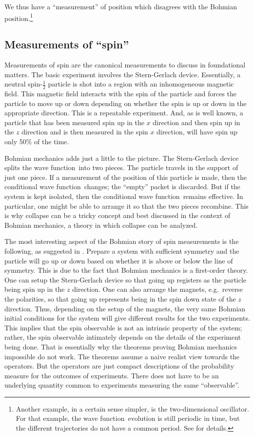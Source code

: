 \documentclass[11pt]{article}
\theoremstyle{remark}
\begin{document}
We thus have a ``measurement'' of
position which disagrees with the Bohmian position.\footnote{Another 
example, in a certain sense simpler, is the two-dimensional
oscillator. For that example, the wave function\ evolution is still periodic in
time, but the different trajectories do not have a common period. See
\cite{DGZ03} for details.}


\subsection{Measurements of ``spin''}

Measurements of spin are the canonical measurements to discuss in
foundational matters. The basic experiment involves the Stern-Gerlach
device. Essentially, a  neutral spin-$\frac{1}{2}$ particle is shot into a
region with an inhomogeneous magnetic field. This magnetic field
interacts with the spin of the particle and forces the particle to
move up or down depending on whether the spin is up or down in the
appropriate direction. This is a repeatable
experiment. And, as is well known, a particle that has been measured spin up in
the $x$ direction and then spin up in the $z$ direction and is then
measured in the spin $x$ direction, will have spin up only 50\% of
the time. 

Bohmian mechanics adds just a little to the picture. The Stern-Gerlach
device splits the wave function\ into two pieces.  The particle travels in the
support of just one piece. If a measurement of the position of this
particle is made, then the conditional wave function\ changes; the ``empty''
packet is discarded. 
But if the system is kept
isolated, then the conditional wave function\ remains effective. In particular,
one might be able to arrange it so that the two pieces recombine. 
This is why
collapse can be a tricky concept and best discussed in the context of
Bohmian mechanics, a theory in which collapse 
can be analyzed. 

The most interesting aspect of the Bohmian story of spin measurements
is the following, as suggested in \cite{A92}. Prepare a system  with
sufficient symmetry and the particle will go up or down based on
whether it is above or below the line of symmetry. This is due to
the fact that Bohmian mechanics is a first-order theory.
One can setup the
Stern-Gerlach device so that going up registers as the particle being
spin up in the $z$ direction. One can also arrange the magnets, e.g.\
reverse the polarities, so that going up
represents being in the spin down state of the $z$ direction. Thus,
depending on the setup of the magnets, the very same Bohmian initial
conditions for the system
will give different results for the two experiments. This 
implies that the spin observable 
is not an intrinsic property of the system; rather, the spin
observable intimately depends on
the details of the experiment being done. That is essentially why the
theorems proving Bohmian mechanics impossible do not work. The
theorems assume  a
naive realist view towards the operators. But the operators are just
compact descriptions of the probability measure for the outcomes of
experiments. There does not have to be an underlying quantity common
to experiments measuring the same ``observable''.
\end{document}
